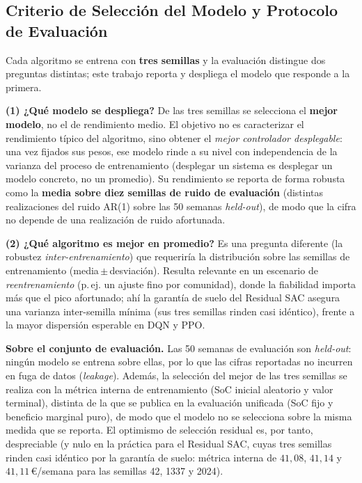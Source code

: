 \documentclass[12pt, a4paper, twoside]{report}
\begin{document}
\subsection{Criterio de Selección del Modelo y Protocolo de Evaluación}
\label{sub:seleccion}

Cada algoritmo se entrena con \textbf{tres semillas} y la evaluación distingue
dos preguntas distintas; este trabajo reporta y despliega el modelo que responde
a la primera.

\textbf{(1) ¿Qué modelo se despliega?} De las tres semillas se selecciona el
\textbf{mejor modelo}, no el de rendimiento medio. El objetivo no es caracterizar
el rendimiento típico del algoritmo, sino obtener el \emph{mejor controlador
desplegable}: una vez fijados sus pesos, ese modelo rinde a su nivel con
independencia de la varianza del proceso de entrenamiento (desplegar un sistema
es desplegar un modelo concreto, no un promedio). Su rendimiento se reporta de
forma robusta como la \textbf{media sobre diez semillas de ruido de evaluación}
(distintas realizaciones del ruido AR(1) sobre las 50 semanas \textit{held-out}),
de modo que la cifra no depende de una realización de ruido afortunada.

\textbf{(2) ¿Qué algoritmo es mejor en promedio?} Es una pregunta diferente
(la robustez \emph{inter-entrenamiento}) que requeriría la distribución sobre las
semillas de entrenamiento (media\,$\pm$\,desviación). Resulta relevante en un
escenario de \emph{reentrenamiento} (p.\,ej. un ajuste fino por comunidad), donde
la fiabilidad importa más que el pico afortunado; ahí la garantía de suelo del
Residual SAC asegura una varianza inter-semilla mínima (sus tres semillas rinden
casi idéntico), frente a la mayor dispersión esperable en DQN y PPO.

\textbf{Sobre el conjunto de evaluación.} Las 50 semanas de evaluación son
\textit{held-out}: ningún modelo se entrena sobre ellas, por lo que las cifras
reportadas no incurren en fuga de datos (\textit{leakage}). Además, la selección
del mejor de las tres semillas se realiza con la métrica interna de entrenamiento
(SoC inicial aleatorio y valor terminal), distinta de la que se publica en la
evaluación unificada (SoC fijo y beneficio marginal puro), de modo que el modelo
no se selecciona sobre la misma medida que se reporta. El optimismo de selección
residual es, por tanto, despreciable (y nulo en la práctica para el Residual SAC,
cuyas tres semillas rinden casi idéntico por la garantía de suelo: métrica
interna de $41{,}08$, $41{,}14$ y $41{,}11$\,€/semana para las semillas 42,
1337 y 2024).
\end{document}
